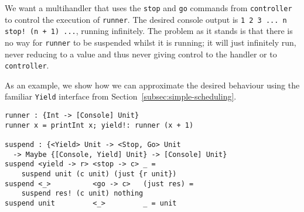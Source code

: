 \documentclass[msc,deptreport,cs]{infthesis} %
\newcommand{\code}[1]{\lstinline{#1}}
\begin{document}

\noindent We want a multihandler that uses the \code{stop} and \code{go}
commands from \code{controller} to control the execution of \code{runner}. The
desired console output is \code{1 2 3 ... n stop! (n + 1) ...}, running
infinitely. The problem as it stands is that there is no way for \code{runner}
to be suspended whilst it is running; it will just infinitely run, never
reducing to a value and thus never giving control to the handler or to
\code{controller}.


%




As an example, we show how we can approximate the desired behaviour using the familiar \code{Yield} interface from Section~\ref{subsec:simple-scheduling}.

\begin{lstlisting}
runner : {Int -> [Console] Unit}
runner x = printInt x; yield!: runner (x + 1)

suspend : {<Yield> Unit -> <Stop, Go> Unit
  -> Maybe {[Console, Yield] Unit} -> [Console] Unit}
suspend <yield -> r> <stop -> c> _ =
    suspend unit (c unit) (just {r unit})
suspend <_>          <go -> c>   (just res) =
    suspend res! (c unit) nothing
suspend unit         <_>         _ = unit
\end{lstlisting}
\end{document}
